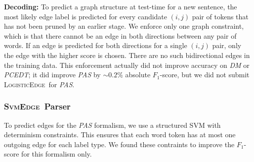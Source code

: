 \documentclass[11pt]{article}
\newcommand{\bocomment}[1]{\textcolor{Bittersweet}{[#1 -BTO]}}
\renewcommand{\bocomment}[1]{}
\newcommand{\codenote}[1]{}
\newcommand{\logitedge}{\textsc{LogisticEdge}}
\newcommand{\svmedge}{\textsc{SvmEdge}}
\begin{document}



\textbf{Decoding:} \codenote{MyGraph::decodeEdgeProbsToGraph()}
To predict a graph structure at test-time for a new sentence,
the most likely edge label is predicted for every candidate $(i, j)$ pair of
tokens that has not been pruned by an earlier stage.
We enforce only one graph constraint, which is that there cannot be
an edge in both directions between any pair of words.
If an edge is predicted for both directions for a single $(i, j)$
pair, only the edge with the higher score is chosen.
There are no such bidirectional edges in the training data.
This enforcement actually did not improve accuracy on \emph{DM} or \emph{PCEDT};
it did improve \emph{PAS} by $\sim 0.2\%$ absolute $F_1$-score, but we did not submit \logitedge\ for \emph{PAS}.
\codenote{\url{https://github.com/Noahs-ARK/semeval-2014/pull/21}}


\subsubsection{\svmedge~Parser}
\label{s:graphparser}


To predict edges for the \emph{PAS} formalism, we use a structured SVM
with determinism constraints.
This ensures that each word token has at most one outgoing edge for each label
type.  We found these contraints to improve the $F_1$-score for this formalism only.
\bocomment{need to answer here: why only PAS?}
\end{document}
